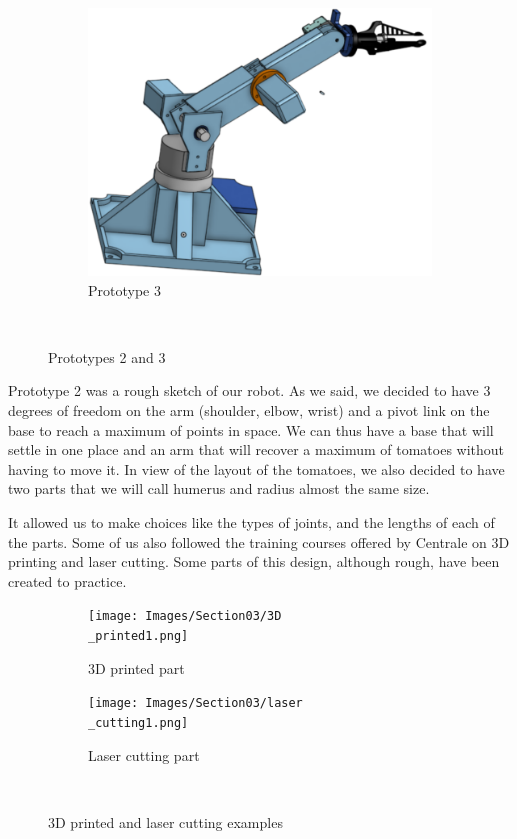 \begin{figure}[H]
\begin{subfigure}{.5\linewidth}
        \includegraphics[scale = 0.3]{Images/Section03/prototype3.png}
        \caption{Prototype 3}
        \label{fig:Prototype3}
    \end{subfigure}\\[1ex]
    \caption{Prototypes 2 and 3}
    \label{fig:Prototypes}
\end{figure}

Prototype 2 was a rough sketch of our robot. As we said, we decided to have 3 degrees of freedom on the arm (shoulder, elbow, wrist) and a pivot link on the base to reach a maximum of points in space. We can thus have a base that will settle in one place and an arm that will recover a maximum of tomatoes without having to move it. In view of the layout of the tomatoes, we also decided to have two parts that we will call humerus and radius almost the same size. 

\bigbreak
It allowed us to make choices like the types of joints, and the lengths of each of the parts. Some of us also followed the training courses offered by Centrale on 3D printing and laser cutting. Some parts of this design, although rough, have been created to practice.
\begin{figure}[H]
    \begin{subfigure}{.5\linewidth}
        \centering
        \texttt{[image: Images/Section03/3D\\\_printed1.png]}
        \caption{3D printed part}
        \label{fig:3D1}
    \end{subfigure}%
    \begin{subfigure}{.5\linewidth}
        \centering
        \texttt{[image: Images/Section03/laser\\\_cutting1.png]}
        \caption{Laser cutting part}
        \label{fig:LC1}
    \end{subfigure}\\[1ex]
    \caption{3D printed and laser cutting examples}
    \label{fig:3DLC1}
\end{figure}

